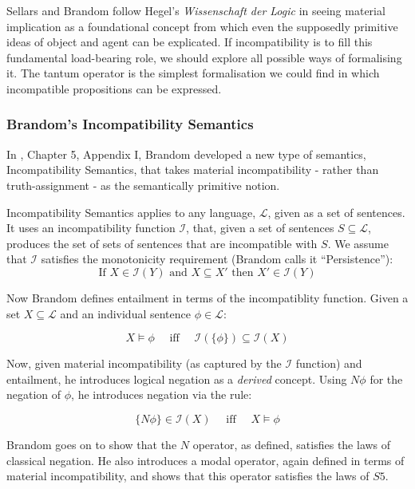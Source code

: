 \NI Sellars and Brandom follow Hegel's \emph{Wissenschaft der Logic}
\cite{HegelGWF:wisdlog} in seeing material implication  as a
foundational concept from which even the supposedly primitive ideas of
object and agent can be explicated.  If incompatibility is to fill
this fundamental load-bearing role, we should explore all possible
ways of formalising it.  The tantum operator is the simplest
formalisation we could find in which incompatible propositions can be
expressed.

\subsubsection{Brandom's Incompatibility Semantics}

\NI In \cite{brandom}, Chapter 5, Appendix I, Brandom developed a new
type of semantics, Incompatibility Semantics, that takes material
incompatibility - rather than truth-assignment - as the semantically
primitive notion.

Incompatibility Semantics applies to any language, $\mathcal{L}$,
given as a set of sentences.  It uses an incompatibility function
$\mathcal{I}$, that, given a set of sentences $S \subseteq
\mathcal{L}$, produces the set of sets of sentences that are
incompatible with $S$.  We assume that $\mathcal{I}$ satisfies the
monotonicity requirement (Brandom calls it ``Persistence''):
\[
   \text{If } X \in \mathcal{I}(Y) \text{ and } X \subseteq X' \text{ then } X' \in \mathcal{I}(Y)
\]

\NI Now Brandom defines entailment in terms of the incompatiblity
function. Given a set $X \subseteq \mathcal{L}$ and an individual
sentence $\phi \in \mathcal{L}$:

\[
   X \models \phi\quad \text{ iff }\quad \mathcal{I}(\{\phi\}) \subseteq \mathcal{I}(X)
\]

\NI Now, given material incompatibility (as captured by the
$\mathcal{I}$ function) and entailment, he introduces logical negation
as a \emph{derived} concept. Using $N \phi$ for the negation of
$\phi$, he introduces negation via the rule:

\[
   \{N \phi\} \in \mathcal{I}(X)\quad \text{ iff }\quad X \models \phi
\]

\NI Brandom goes on to show that the $N$ operator, as defined, satisfies
the laws of classical negation.  He also introduces a modal operator,
again defined in terms of material incompatibility, and shows that
this operator satisfies the laws of $S5$.


